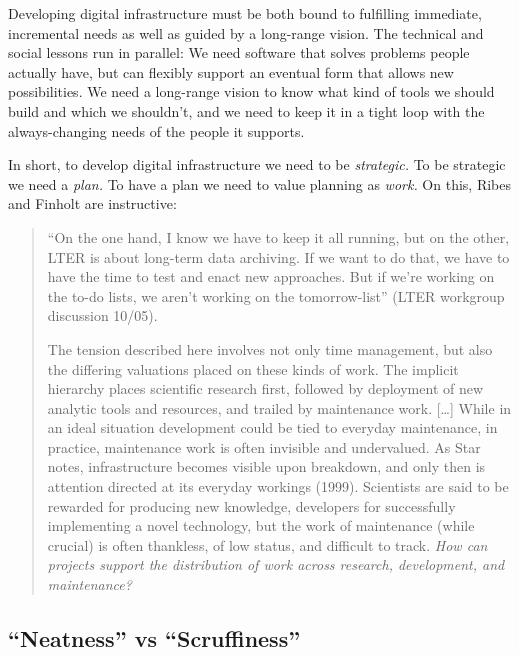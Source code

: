 \documentclass[notoc]{tufte-book}
\begin{document}
Developing digital infrastructure must be both bound to fulfilling
immediate, incremental needs as well as guided by a long-range vision.
The technical and social lessons run in parallel: We need software that
solves problems people actually have, but can flexibly support an
eventual form that allows new possibilities. We need a long-range vision
to know what kind of tools we should build and which we shouldn't, and
we need to keep it in a tight loop with the always-changing needs of the
people it supports.

In short, to develop digital infrastructure we need to be
\emph{strategic.} To be strategic we need a \emph{plan.} To have a plan
we need to value planning as \emph{work.} On this, Ribes and Finholt are
instructive:

\begin{quote}
``On the one hand, I know we have to keep it all running, but on the
other, LTER is about long-term data archiving. If we want to do that, we
have to have the time to test and enact new approaches. But if we're
working on the to-do lists, we aren't working on the tomorrow-list''
(LTER workgroup discussion 10/05).

The tension described here involves not only time management, but also
the differing valuations placed on these kinds of work. The implicit
hierarchy places scientific research first, followed by deployment of
new analytic tools and resources, and trailed by maintenance work.
{[}\ldots{]} While in an ideal situation development could be tied to
everyday maintenance, in practice, maintenance work is often invisible
and undervalued. As Star notes, infrastructure becomes visible upon
breakdown, and only then is attention directed at its everyday workings
(1999). Scientists are said to be rewarded for producing new knowledge,
developers for successfully implementing a novel technology, but the
work of maintenance (while crucial) is often thankless, of low status,
and difficult to track. \emph{How can projects support the distribution
of work across research, development, and maintenance?} \citep{ribesLongNowTechnology2009} 
\end{quote}


\subsection{``Neatness'' vs
``Scruffiness''}
\end{document}
